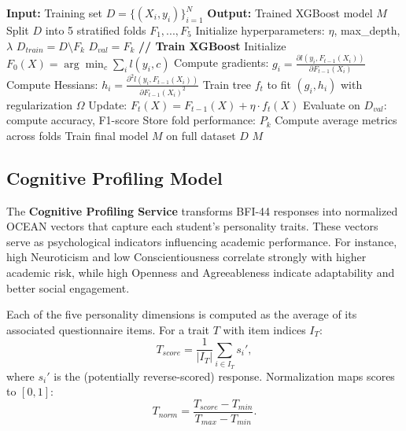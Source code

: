 \documentclass[conference]{IEEEtran}
\begin{document}
\begin{table}[H]
\centering
\begin{minipage}{0.48\textwidth}
\begin{algorithmic}[1]
\STATE \textbf{Input:} Training set $D = \{(X_i, y_i)\}_{i=1}^{N}$
\STATE \textbf{Output:} Trained XGBoost model $M$
\STATE
\STATE Split $D$ into 5 stratified folds $F_1, ..., F_5$
\STATE Initialize hyperparameters: $\eta$, max\_depth, $\lambda$
\STATE
{}
    \STATE $D_{train} = D \setminus F_k$
    \STATE $D_{val} = F_k$
    \STATE
    \STATE \textbf{// Train XGBoost}
    \STATE Initialize $F_0(X) = \arg\min_c \sum_i l(y_i, c)$
        \STATE Compute gradients: $g_i = \frac{\partial l(y_i, F_{t-1}(X_i))}{\partial F_{t-1}(X_i)}$
        \STATE Compute Hessians: $h_i = \frac{\partial^2 l(y_i, F_{t-1}(X_i))}{\partial F_{t-1}(X_i)^2}$
        \STATE Train tree $f_t$ to fit $(g_i, h_i)$ with regularization $\Omega$
        \STATE Update: $F_t(X) = F_{t-1}(X) + \eta \cdot f_t(X)$
    \ENDFOR
    \STATE
    \STATE Evaluate on $D_{val}$: compute accuracy, F1-score
    \STATE Store fold performance: $P_k$
\ENDFOR
\STATE
\STATE Compute average metrics across folds
\STATE Train final model $M$ on full dataset $D$
\RETURN $M$
\end{algorithmic}
\label{alg:risk}
\end{minipage}
\end{table}

\subsection{Cognitive Profiling Model}
The \textbf{Cognitive Profiling Service} transforms BFI-44 responses into normalized OCEAN vectors that capture each student's personality traits. These vectors serve as psychological indicators influencing academic performance. For instance, high Neuroticism and low Conscientiousness correlate strongly with higher academic risk, while high Openness and Agreeableness indicate adaptability and better social engagement.  

Each of the five personality dimensions is computed as the average of its associated questionnaire items. For a trait $T$ with item indices $I_T$:
\begin{equation}
    T_{score} = \frac{1}{|I_T|} \sum_{i \in I_T} s_i',
\end{equation}
where $s_i'$ is the (potentially reverse-scored) response. Normalization maps scores to $[0,1]$:
\begin{equation}
    T_{norm} = \frac{T_{score} - T_{min}}{T_{max} - T_{min}}.
\end{equation}
\end{document}
